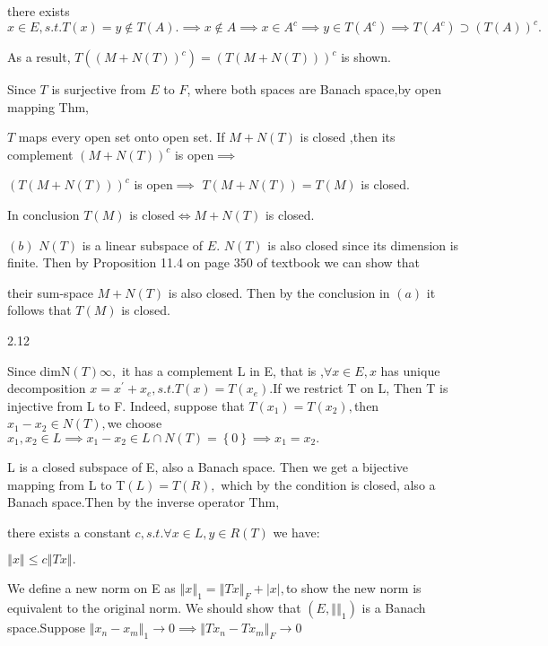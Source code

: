 \documentclass{article}
\begin{document}
there exists $x\in E,s.t.T\left( x\right) =y\notin T\left( A\right)
.\implies x\notin A\implies x\in A^{c}\implies y\in T\left( A^{c}\right)
\implies T\left( A^{c}\right) \supset \left( T\left( A\right) \right) ^{c}.$

As a result, $T\left( \left( M+N\left( T\right) \right) ^{c}\right) =\left(
T\left( M+N\left( T\right) \right) \right) ^{c}$ is shown.

Since $T$ is surjective from $E$ to $F$, where both spaces are Banach
space,by open mapping Thm,

$T$ maps every open set onto open set. If $M+N\left( T\right) $ is closed
,then its complement $\left( M+N\left( T\right) \right) ^{c}$ is open$%
\implies $

$\left( T\left( M+N\left( T\right) \right) \right) ^{c}$ is open$\implies $ $%
T\left( M+N\left( T\right) \right) =T\left( M\right) $ is closed.

In conclusion $T\left( M\right) $ is closed$\iff M+N\left( T\right) $ is
closed.

$\left( b\right) $ $N\left( T\right) $ is a linear subspace of $E$. $N\left(
T\right) $ is also closed since its dimension is finite. Then by Proposition
11.4 on page 350 of textbook we can show that

their sum-space $M+N\left( T\right) $ is also closed. Then by the conclusion
in $\left( a\right) $ it follows that $T\left( M\right) $ is closed.

2.12

Since dimN$\left( T\right) $\TEXTsymbol{<}$\infty ,$ it has a complement L
in E, that is ,$\forall x\in E,x$ has unique decomposition $x=x^{\prime
}+x_{e},s.t.T\left( x\right) =T\left( x_{e}\right) .$If we restrict T on L,
Then T is injective from L to F. Indeed, suppose that $T\left( x_{1}\right)
=T\left( x_{2}\right) ,$then $x_{1}-x_{2}\in N\left( T\right) ,$we choose $%
x_{1},x_{2}\in L\implies x_{1}-x_{2}\in L\cap N\left( T\right) =\left\{
0\right\} \implies x_{1}=x_{2}.$

L is a closed subspace of E, also a Banach space. Then we get a bijective
mapping from L to T$\left( L\right) =T\left( R\right) ,$ which by the
condition is closed, also a Banach space$.$Then by the inverse operator Thm,

there exists a constant $c,s.t.\forall x\in L,y\in R\left( T\right) $ we
have:

$\left\Vert x\right\Vert \leq c\left\Vert Tx\right\Vert .$

We define a new norm on E as $\left\Vert x\right\Vert _{1}=\left\Vert
Tx\right\Vert _{F}+\left\vert x\right\vert ,$to show the new norm is
equivalent to the original norm. We should show that $\left( E,\left\Vert
{}\right\Vert _{1}\right) $ is a Banach space.Suppose $\left\Vert
x_{n}-x_{m}\right\Vert _{1}\rightarrow 0\implies \left\Vert
Tx_{n}-Tx_{m}\right\Vert _{F}\rightarrow 0$
\end{document}

